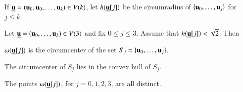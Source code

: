 \begin{definition}[h]
If ${\underline{{\mathbf u}}}=( {\mathbf u}_0, {\mathbf u}_0,\ldots, {\mathbf u}_k)\in V(k)$, 
let $h({\underline{{\mathbf u}}}[j])$ be the circumradius of $\{ {\mathbf u}_0,\ldots, {\mathbf u}_j\}$ for $j\le k$.
\end{definition}
%

\begin{lemma}\label{lemma:v2} 
Let ${\underline{{\mathbf u}}}=( {\mathbf u}_0,\ldots, {\mathbf u}_3)\in V(3)$ and fix $0\le j\le 3$.  Assume that $h({\underline{{\mathbf u}}}[j])<\sqrt2$.
Then 
\begin{nomerate}
\item {} $\omega({\underline{{\mathbf u}}}[j])$ is the circumcenter of the set $S_j =\{ {\mathbf u}_0,\ldots, {\mathbf u}_j\}$. 
\item {} The circumcenter of $S_j$  lies in the convex hull of $S_j$.  
\item {}  The points $\omega({\underline{{\mathbf u}}}[j])$, for $j=0,1,2,3$, are all distinct.
\end{nomerate}
\end{lemma}
%

